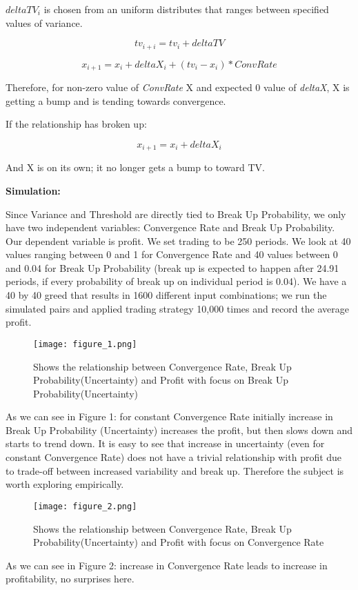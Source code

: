 \documentclass[11pt]{report}
\begin{document}
$deltaTV_i$ is chosen from an uniform distributes that ranges between specified values of variance.

\begin{equation}
tv_{i+i} = tv_i + deltaTV
\end{equation}


\begin{equation}
x_{i+1} = x_i + deltaX_{i} + (tv_i - x_i) * ConvRate
\end{equation}

Therefore, for non-zero value of \textit{ConvRate} X and expected 0 value of \textit{deltaX}, X is getting a bump and is tending towards convergence.

If the relationship has broken up:

\begin{equation}
x_{i+1} = x_i + deltaX_{i}
\end{equation}

And X is on its own; it no longer gets a bump to toward TV.

\textbf{Simulation:}

Since Variance and Threshold are directly tied to Break Up Probability, we only have two independent variables: Convergence Rate and Break Up Probability. Our dependent variable is profit. We set trading to be 250 periods. We look at 40 values ranging between 0 and 1 for Convergence Rate and 40 values between 0 and 0.04 for Break Up Probability (break up is expected to happen after 24.91 periods, if every probability of break up on individual period is 0.04). We have a 40 by 40 greed that results in 1600 different input combinations; we run the simulated pairs and applied trading strategy 10,000 times and record the average profit. 

\begin{figure}[ht!]
\centering
\texttt{[image: figure\_1.png]}
\caption{Shows the relationship between Convergence Rate, Break Up Probability(Uncertainty) and Profit with focus on Break Up Probability(Uncertainty)}
\label{overflow}
\end{figure}

As we can see in Figure 1: for constant Convergence Rate initially increase in Break Up Probability (Uncertainty) increases the profit, but then slows down and starts to trend down. It is easy to see that increase in uncertainty (even for constant Convergence Rate) does not have a trivial relationship with profit due to trade-off between increased variability and break up. Therefore the subject is worth exploring empirically.

\begin{figure}[ht!]
\centering
\texttt{[image: figure\_2.png]}
\caption{Shows the relationship between Convergence Rate, Break Up Probability(Uncertainty) and Profit with focus on Convergence Rate}
\label{overflow}
\end{figure}

As we can see in Figure 2: increase in Convergence Rate leads to increase in profitability, no surprises here. 
\end{document}
